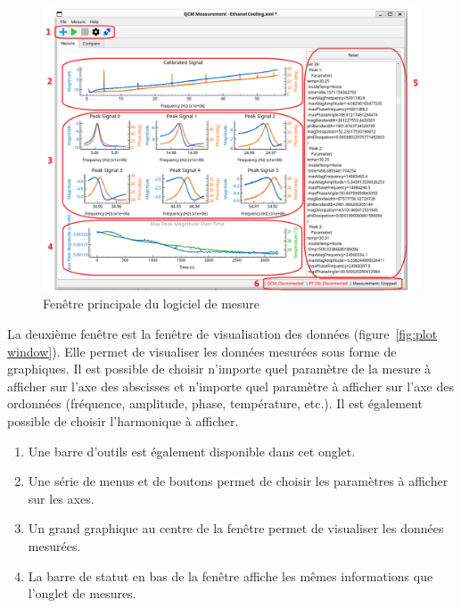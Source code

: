 \begin{figure}[H]
    \centering
    \includegraphics[width=\textwidth]{assets/figures/Programme_.png}
    \caption{Fenêtre principale du logiciel de mesure}
    \label{fig:main window}
\end{figure}

\newpage
La deuxième fenêtre est la fenêtre de visualisation des données (figure~\ref{fig:plot window}).  
Elle permet de visualiser les données mesurées sous forme de graphiques.  
Il est possible de choisir n'importe quel paramètre de la mesure à afficher sur l'axe des abscisses et n'importe quel paramètre à afficher sur l'axe des ordonnées (fréquence, amplitude, phase, température, etc.).  
Il est également possible de choisir l'harmonique à afficher.

\begin{enumerate}
    \item Une barre d'outils est également disponible dans cet onglet.
    \item Une série de menus et de boutons permet de choisir les paramètres à afficher sur les axes.
    \item Un grand graphique au centre de la fenêtre permet de visualiser les données mesurées.
    \item La barre de statut en bas de la fenêtre affiche les mêmes informations que l'onglet de mesures.
\end{enumerate}

